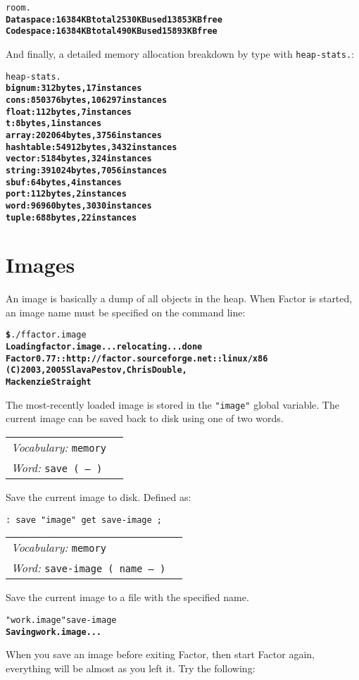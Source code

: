 \documentclass{book}
\newcommand{\vocabulary}[1]{\emph{Vocabulary:} \texttt{#1}&\\}
\newcommand{\ordinaryword}[2]{\index{\texttt{#1}}\emph{Word:} \texttt{#2}&\\}
\newcommand{\wordtable}[1]{


\begin{tabularx}{12cm}{lX}
\hline
#1
\hline
\end{tabularx}

}
\begin{document}
\begin{alltt}
  room.
\textbf{Data space: 16384 KB total 2530 KB used 13853 KB free
Code space: 16384 KB total 490 KB used 15893 KB free}
\end{alltt}

And finally, a detailed memory allocation breakdown by type with \texttt{heap-stats.}:

\begin{alltt}
  heap-stats.
\textbf{bignum: 312 bytes, 17 instances
cons: 850376 bytes, 106297 instances
float: 112 bytes, 7 instances
t: 8 bytes, 1 instances
array: 202064 bytes, 3756 instances
hashtable: 54912 bytes, 3432 instances
vector: 5184 bytes, 324 instances
string: 391024 bytes, 7056 instances
sbuf: 64 bytes, 4 instances
port: 112 bytes, 2 instances
word: 96960 bytes, 3030 instances
tuple: 688 bytes, 22 instances}
\end{alltt}

\chapter{Images}\label{images}


An image is basically a dump of all objects in the heap. When Factor is started, an image name must be specified on the command line:
\begin{alltt}
\textbf{\$} ./f factor.image
\textbf{Loading factor.image... relocating... done
Factor 0.77 :: http://factor.sourceforge.net :: linux/x86
(C) 2003, 2005 Slava Pestov, Chris Double,
Mackenzie Straight}
\end{alltt}
The most-recently loaded image is stored in the \verb|"image"| global variable.
The current image can be saved back to disk using one of two words.

\wordtable{
\vocabulary{memory}
\ordinaryword{save}{save ( -- )}
}
Save the current image to disk. Defined as:
\begin{verbatim}
: save "image" get save-image ;
\end{verbatim}
\wordtable{
\vocabulary{memory}
\ordinaryword{save-image}{save-image ( name -- )}
}
Save the current image to a file with the specified name.
\begin{alltt}
  "work.image" save-image
\textbf{Saving work.image...}
\end{alltt}

When you save an image before exiting Factor, then start Factor again, everything will be almost as you left it. Try the following:
\end{document}
